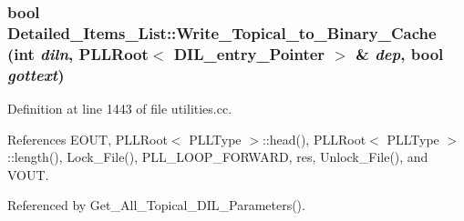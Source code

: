 \subsubsection{\setlength{\rightskip}{0pt plus 5cm}bool Detailed\_\-Items\_\-List::Write\_\-Topical\_\-to\_\-Binary\_\-Cache (int {\em diln}, {\bf PLLRoot}$<$ {\bf DIL\_\-entry\_\-Pointer} $>$ \& {\em dep}, bool {\em gottext})\hspace{0.3cm}{\tt  [protected]}}\label{classDetailed__Items__List_b2}




Definition at line 1443 of file utilities.cc.

References EOUT, PLLRoot$<$ PLLType $>$::head(), PLLRoot$<$ PLLType $>$::length(), Lock\_\-File(), PLL\_\-LOOP\_\-FORWARD, res, Unlock\_\-File(), and VOUT.

Referenced by Get\_\-All\_\-Topical\_\-DIL\_\-Parameters().



